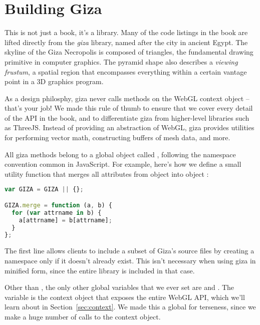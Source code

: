\section{Building Giza}

This is not just a book, it's a library.  Many of the code listings in the book are lifted directly from the \emph{giza} library, named after the city in ancient Egypt.  The skyline of the Giza Necropolis is composed of triangles, the fundamental drawing primitive in computer graphics.  The pyramid shape also describes a \emph{viewing frustum}, a spatial region that encompasses everything within a certain vantage point in a 3D graphics program.

As a design philosphy, giza never calls methods on the WebGL context object -- that's your job!  We made this rule of thumb to ensure that we cover every detail of the API in the book, and to differentiate giza from higher-level libraries such as ThreeJS.  Instead of providing an abstraction of WebGL, giza provides utilities for performing vector math, constructing buffers of mesh data, and more.

All giza methods belong to a global object called , following the namespace convention common in JavaScript.  For example, here's how we define a small utility function that merges all attributes from object  into object :

\begin{lstlisting}[language=JavaScript]
var GIZA = GIZA || {};

GIZA.merge = function (a, b) {
  for (var attrname in b) {
    a[attrname] = b[attrname];
  }
};
\end{lstlisting}

The first line allows clients to include a subset of Giza's source files by creating a  namespace only if it doesn't already exist.  This isn't necessary when using giza in minified form, since the entire library is included in that case.

Other than , the only other global variables that we ever set are  and .  The  variable is the context object that exposes the entire WebGL API, which we'll learn about in Section~\ref{sec:context}.  We made this a global for terseness, since we make a huge number of calls to the context object.

